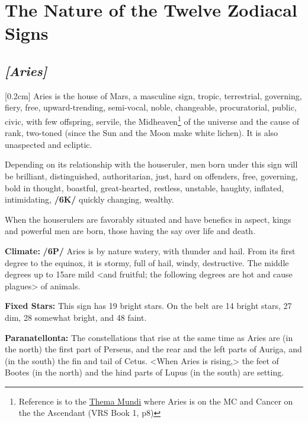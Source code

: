 
\section{The Nature of the Twelve Zodiacal Signs}
\subsection{\textit{[Aries]}}
[0.2cm]
Aries is the house of Mars, a masculine sign, tropic, terrestrial, governing, fiery, free, upward-trending,
semi-vocal, noble, changeable, procuratorial, public, civic, with few offspring, servile, the Midheaven\footnote{Reference is to the \href{http://planetwavesweekly.com/dadatemp/1832374392.html}{Thema Mundi} where Aries is on the MC and Cancer on the the Ascendant (VRS Book 1, p8)} of the universe and the cause of rank, two-toned (since the Sun and the Moon make white lichen). It is also unaspected and ecliptic. 

\mndl[0.2cm]
Depending on its relationship with the houseruler, men born under this sign will be brilliant, distinguished, authoritarian, just, hard on offenders, free, governing, bold in thought, boastful, great-hearted, restless, unstable, haughty, inflated, intimidating, \textbf{/6K/} quickly changing, wealthy. 

\mndl[0.2cm]
When the houserulers are favorably situated and have benefics in aspect, kings and powerful men are born, those
having the say over life and death.

\textbf{Climate:} \textbf{/6P/} Aries is by nature watery, with thunder and hail. From its first degree to the equinox, it is stormy, full of hail, windy, destructive. The middle degrees up to 15\deg are mild <and fruitful; the following degrees are hot and cause plagues> of animals. 

\textbf{Fixed Stars:} This sign has 19 bright stars. On the belt are 14 bright stars, 27 dim, 28 somewhat bright, and 48 faint. 

\textbf{Paranatellonta:} The constellations that rise at the same time as Aries are (in the north) the first part of Perseus, and the rear and the left parts of Auriga, and (in the south) the fin and
tail of Cetus. <When Aries is rising,> the feet of Bootes (in the north) and the hind parts of Lupus (in the south) are setting.

